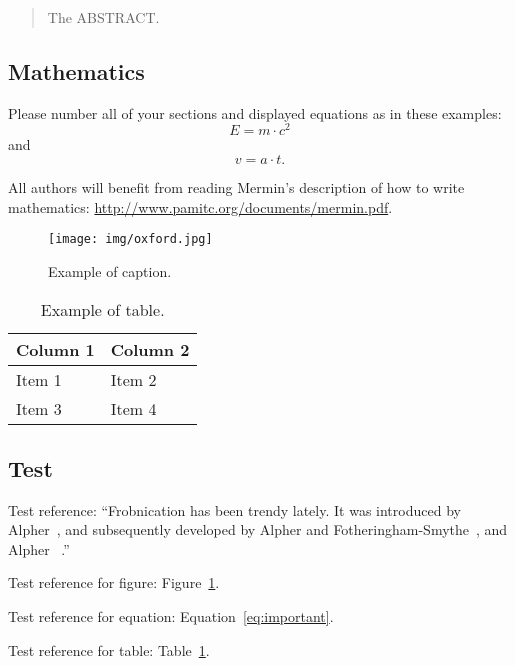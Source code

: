 \begin{abstract}
   The ABSTRACT.
\end{abstract}

\subsection{Mathematics}

Please number all of your sections and displayed equations as in these examples:
\begin{equation}
  E = m\cdot c^2
  \label{eq:important}
\end{equation}
and
\begin{equation}
  v = a\cdot t.
  \label{eq:also-important}
\end{equation}

All authors will benefit from reading Mermin's description of how to write mathematics:
\url{http://www.pamitc.org/documents/mermin.pdf}.


\begin{figure}[t]
  \centering
  \texttt{[image: img/oxford.jpg]}

   \caption{Example of caption.}
   \label{fig:onecol}
\end{figure}

\begin{table}[t]
  \centering
  \begin{tabular}{ll}
    \toprule
    \textbf{Column 1} & \textbf{Column 2} \\
    \midrule
    Item 1 & Item 2 \\
    Item 3 & Item 4 \\
    \bottomrule
  \end{tabular}
  \caption{Example of table.}
  \label{tab:onecol}
\end{table}

\subsection{Test}

Test reference:
   ``Frobnication has been trendy lately.
   It was introduced by Alpher~\cite{Alpher02}, and subsequently developed by
   Alpher and Fotheringham-Smythe~\cite{Alpher03}, and Alpher \etal~\cite{Alpher04}.''

Test reference for figure: Figure~\ref{fig:onecol}.

Test reference for equation: Equation~\ref{eq:important}.

Test reference for table: Table~\ref{tab:onecol}.

\begin{comment}
{\small


}


\end{comment}
